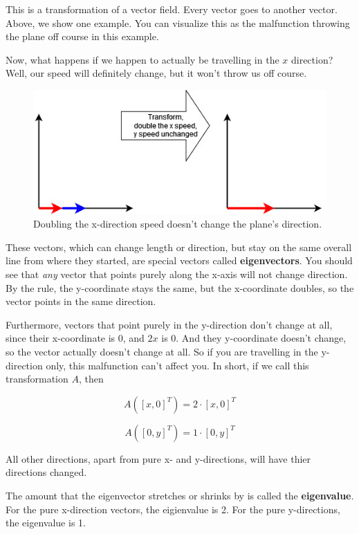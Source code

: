 \documentclass[
]{book}
\begin{document}
This is a transformation of a vector field. Every vector goes to another vector. Above, we show one example. You can visualize this as the malfunction throwing the plane off course in this example.

Now, what happens if we happen to actually be travelling in the \(x\) direction? Well, our speed will definitely change, but it won't throw us off course.

\begin{figure}

{\centering \includegraphics[width=0.75\linewidth,height=0.75\textheight]{images/Eigenvectors-02} 

}

\caption{Doubling the x-direction speed doesn't change the plane's direction.}\label{fig:unnamed-chunk-7}
\end{figure}

These vectors, which can change length or direction, but stay on the same overall line from where they started, are special vectors called \textbf{eigenvectors}. You should see that \emph{any} vector that points purely along the x-axis will not change direction. By the rule, the y-coordinate stays the same, but the x-coordinate doubles, so the vector points in the same direction.

Furthermore, vectors that point purely in the y-direction don't change at all, since their x-coordinate is 0, and \(2 x\) is \(0\). And they y-coordinate doesn't change, so the vector actually doesn't change at all. So if you are travelling in the y-direction only, this malfunction can't affect you. In short, if we call this transformation \(A\), then

\[A([x, 0]^T) = 2 \cdot [x, 0]^T\]

\[A([0, y]^T) = 1 \cdot [0, y]^T\]

All other directions, apart from pure x- and y-directions, will have thier directions changed.

The amount that the eigenvector stretches or shrinks by is called the \textbf{eigenvalue}. For the pure x-direction vectors, the eigienvalue is 2. For the pure y-directions, the eigenvalue is 1.
\end{document}
